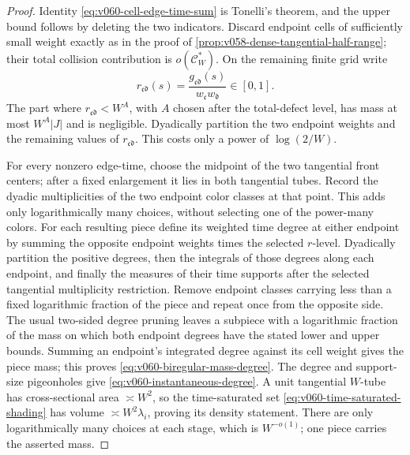 \documentclass[10pt]{article}
\begin{document}
\begin{proof}
Identity \eqref{eq:v060-cell-edge-time-sum} is Tonelli's theorem, and the upper bound follows by
deleting the two indicators.  Discard endpoint cells of sufficiently small weight exactly as in
the proof of \cref{prop:v058-dense-tangential-half-range}; their total collision contribution is
\(o(\mathcal C_W^*)\).  On the remaining finite grid write
\[
r_{\mathfrak c\mathfrak d}(s)
=
\frac{g_{\mathfrak c\mathfrak d}(s)}
{w_{\mathfrak c}w_{\mathfrak d}}
\in[0,1].
\]
The part where \(r_{\mathfrak c\mathfrak d}<W^A\), with \(A\) chosen after the total-defect
level, has mass at most \(W^A|J|\) and is negligible.  Dyadically partition the two endpoint
weights and the remaining values of \(r_{\mathfrak c\mathfrak d}\).  This costs only a power of
\(\log(2/W)\).

For every nonzero edge-time, choose the midpoint of the two tangential front centers; after a fixed
enlargement it lies in both tangential tubes.  Record the dyadic multiplicities of the two endpoint
color classes at that point.  This adds only logarithmically many choices, without selecting one
of the power-many colors.  For each resulting piece define its weighted time degree at either endpoint by summing the
opposite endpoint weights times the selected \(r\)-level.  Dyadically partition the positive
degrees, then the integrals of those degrees along each endpoint, and finally the measures of their
time supports after the selected tangential multiplicity restriction.  Remove endpoint classes carrying less than a fixed logarithmic fraction of the
piece and repeat once from the opposite side.  The usual two-sided degree pruning leaves a
subpiece with a logarithmic fraction of the mass on which both endpoint degrees have the stated
lower and upper bounds.  Summing an endpoint's integrated degree against its cell weight gives the
piece mass; this proves \eqref{eq:v060-biregular-mass-degree}.  The degree and support-size
pigeonholes give \eqref{eq:v060-instantaneous-degree}.  A unit tangential \(W\)-tube has
cross-sectional area \(\asymp W^2\), so the time-saturated set
\eqref{eq:v060-time-saturated-shading} has volume
\(\asymp W^2\lambda_i\), proving its density statement.  There are only logarithmically many
choices at each stage, which is \(W^{-o(1)}\); one piece carries the asserted mass.
\end{proof}
\end{document}
